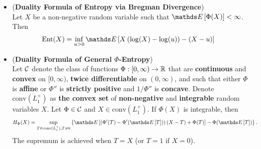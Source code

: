 \documentclass[11pt]{article}
\begin{document}
\begin{itemize}
\item \begin{corollary} (\textbf{Duality Formula of Entropy via Bregman Divergence}) \citep{boucheron2013concentration}\\
Let $X$ be a non-negative random variable such that $\E{}{\Phi(X)} < \infty$. Then 
\begin{align}
\text{Ent}(X) &= \inf_{u > 0}\E{}{X\paren{\log(X) - \log(u)} - (X - u) } \label{eqn: duality_entropy_3_breg}
\end{align}
\end{corollary}

\item \begin{theorem} \label{thm: duality_general_phi_entropy} (\textbf{Duality Formula of General $\Phi$-Entropy}) \citep{boucheron2013concentration}\\
Let ${\mathcal C}$ denote the class of functions $\Phi: [0, \infty) \to {\mathbb R}$ that are \textbf{continuous} and \textbf{convex} on $[0, \infty)$, \textbf{twice differentiable} on $(0, \infty)$, and such that either $\Phi$ is \textbf{affine} or $\Phi''$ is \textbf{strictly positive} and $1/\Phi''$ is \textbf{concave}. Denote $\text{conv}(L_{1}^{+})$ as \textbf{the convex set} of \textbf{non-negative} and \textbf{integrable} random variables $X$. Let $\Phi \in {\mathcal C}$ and $X \in \text{conv}(L_{1}^{+})$. If $\Phi(X)$ is integrable, then
\begin{align}
H_{\Phi}(X) &=  \sup_{T \in \text{conv}(L_{1}^{+}), T\neq 0}\set{\E{}{\paren{\Phi'(T) - \Phi'(\E{}{T})}(X-T) + \Phi(T)} - \Phi(\E{}{T})}.  \label{eqn: duality_phi_entropy_general}
\end{align} The supremum is achieved when $T=X$ (or $T=1$ if $X=0$).
\end{theorem}
\end{itemize}
\end{document}
